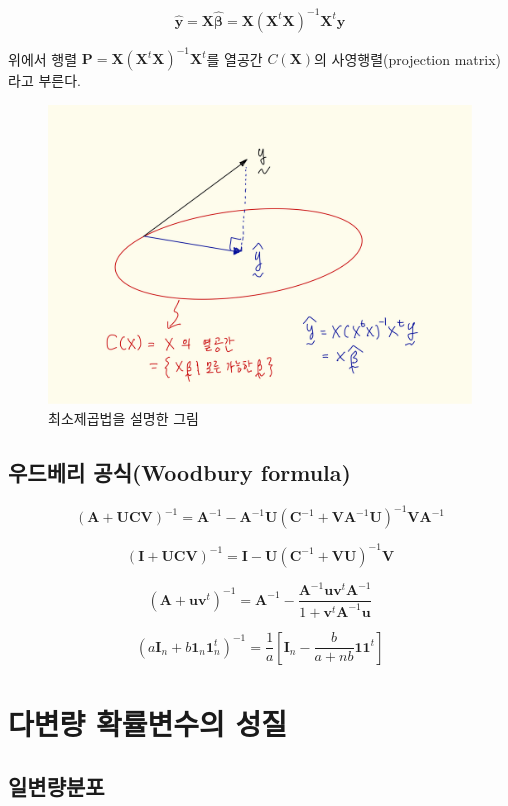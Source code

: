 \documentclass[
  10pt,
]{book}
\theoremstyle{definition}
\theoremstyle{definition}
\theoremstyle{definition}
\theoremstyle{definition}
\theoremstyle{remark}
\begin{document}
\[ \hat {\bm y} = \bm X \hat {\bm \beta} = \bm  X(\bm X^t \bm X)^{-1} \bm X^t \bm y \]

위에서 행렬 \(\bm P = \bm X(\bm X^t \bm X)^{-1} \bm X^t\)를 열공간 \(C(\bm X)\)의 사영행렬(projection matrix)라고 부른다.

\begin{figure}
\includegraphics[width=0.8\linewidth]{myimages/proj2} \caption{최소제곱법을 설명한 그림}\label{fig:projection2}
\end{figure}

\hypertarget{uxc6b0uxb4dcuxbca0uxb9ac-uxacf5uxc2ddwoodbury-formula}{%
\section{우드베리 공식(Woodbury formula)}\label{uxc6b0uxb4dcuxbca0uxb9ac-uxacf5uxc2ddwoodbury-formula}}

\[ (\bm A+\bm U\bm C\bm V)^{-1} = \bm A^{-1}-\bm A^{-1} \bm U (\bm C^{-1} + \bm V \bm A^{-1}\bm U)^{-1} \bm V \bm A^{-1} \]

\[ (\bm I+\bm U\bm C\bm V)^{-1} = \bm I - \bm U (\bm C^{-1} + \bm V \bm U)^{-1} \bm V \]

\[ (\bm A+\bm u\bm v^t)^{-1} = \bm A^{-1} - \frac{ \bm A^{-1} \bm u\bm v^t \bm A^{-1}}{1+\bm v^t \bm A^{-1}\bm u} \]

\[ (a \bm I_n + b \bm 1_n \bm 1_n^t)^{-1} = \frac{1}{a} \left [ \bm I_n - \frac{b}{a+nb} \bm 1 \bm 1^t \right ] \]

\hypertarget{mulivar}{%
\chapter{다변량 확률변수의 성질}\label{mulivar}}

\hypertarget{uxc77cuxbcc0uxb7c9uxbd84uxd3ec}{%
\section{일변량분포}\label{uxc77cuxbcc0uxb7c9uxbd84uxd3ec}}
\end{document}

